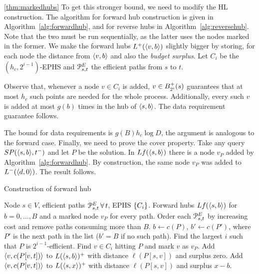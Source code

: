 \begin{proofof}{\cref{thm:markedhubs}}
	To get this stronger bound, we need to modify the HL construction. The algorithm for forward hub construction is given in Algorithm~\ref{alg:forwardhub}, and for reverse hubs in Algorithm~\ref{alg:reversehub}. Note that the two must be run sequentially, as the latter uses the nodes marked in the former. We make the forward hubs $\Lf(\pp{v,b})$ slightly bigger by storing, for each node the distance from $\pp{v,b}$ and also the \emph{budget surplus}.
	Let $C_i$ be the $(h_c,2^{i-1})$-EPHS and $\PE_{s,t}$ the efficient paths from $s$ to $t$.
	
	Observe that, whenever a node $v\in C_i$ is added, $v\in \Bf_{2^i}(s)$ guarantees that at most $h_c$ such points are needed for the whole process.
	Additionally, every such $v$ is added at most $g(b)$ times in the hub of $\pp{s,b}$.
	The data requirement guarantee follows.
	
	The bound for data requirements is $g(B) h_c\log D$, the argument is analogous to the forward case.
	Finally, we need to prove the cover property.
	Take any query $SP(\pp{s,b},t^-)$ and let $P$ be the solution.
	In $Lf(\pp{s,b})$ there is a node $v_P$ added by Algorithm~\ref{alg:forwardhub}.
	By construction, the same node $v_P$ was added to $\Lb(\pp{d,0})$. The result follows.
\end{proofof}

\begin{algorithm}
	\small
	\caption{Construction of forward hub}
	\label{alg:forwardhub}
	\begin{algorithmic}[1]
		\Require Node $s\in V$, efficient paths $\PE_{s,t}\,\forall\,t$, EPHS $\crl*{C_i}$.
		\Ensure Forward hubs $Lf(\pp{s,b})$ for $b=0,\ldots,B$ and a marked node $v_P$ for every path.
		\State Order each $\PE_{s,t}$ by increasing cost and remove paths consuming more than $B$.
		\State $b\gets c(P)$, $b'\gets c(P')$, where $P'$ is the next path in the list ($b'=B$ if no such path).
		\State Find the largest $i$ such that $P$ is $2^{i-1}$-efficient.
		\State Find $v\in C_i$ hitting $P$ and mark $v$ as $v_P$.
		\State Add $\pp{v,c(P[v,t])}$ to $L(\pp{s,b})^+$  with distance $\ell(P[s,v])$ and surplus zero.
		\State Add $\pp{v,c(P[v,t])}$ to $L(\pp{s,x})^+$  with distance $\ell(P[s,v])$ and surplus $x-b$.
		\EndFor
		\EndFor
		\EndFor
	\end{algorithmic}
\end{algorithm}

